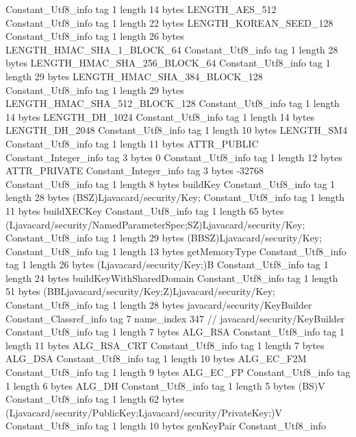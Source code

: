 {{		Constant_Utf8_info {
			tag	1
			length	14
			bytes	LENGTH_AES_512
		}
		Constant_Utf8_info {
			tag	1
			length	22
			bytes	LENGTH_KOREAN_SEED_128
		}
		Constant_Utf8_info {
			tag	1
			length	26
			bytes	LENGTH_HMAC_SHA_1_BLOCK_64
		}
		Constant_Utf8_info {
			tag	1
			length	28
			bytes	LENGTH_HMAC_SHA_256_BLOCK_64
		}
		Constant_Utf8_info {
			tag	1
			length	29
			bytes	LENGTH_HMAC_SHA_384_BLOCK_128
		}
		Constant_Utf8_info {
			tag	1
			length	29
			bytes	LENGTH_HMAC_SHA_512_BLOCK_128
		}
		Constant_Utf8_info {
			tag	1
			length	14
			bytes	LENGTH_DH_1024
		}
		Constant_Utf8_info {
			tag	1
			length	14
			bytes	LENGTH_DH_2048
		}
		Constant_Utf8_info {
			tag	1
			length	10
			bytes	LENGTH_SM4
		}
		Constant_Utf8_info {
			tag	1
			length	11
			bytes	ATTR_PUBLIC
		}
		Constant_Integer_info {
			tag	3
			bytes	0
		}
		Constant_Utf8_info {
			tag	1
			length	12
			bytes	ATTR_PRIVATE
		}
		Constant_Integer_info {
			tag	3
			bytes	-32768
		}
		Constant_Utf8_info {
			tag	1
			length	8
			bytes	buildKey
		}
		Constant_Utf8_info {
			tag	1
			length	28
			bytes	(BSZ)Ljavacard/security/Key;
		}
		Constant_Utf8_info {
			tag	1
			length	11
			bytes	buildXECKey
		}
		Constant_Utf8_info {
			tag	1
			length	65
			bytes	(Ljavacard/security/NamedParameterSpec;SZ)Ljavacard/security/Key;
		}
		Constant_Utf8_info {
			tag	1
			length	29
			bytes	(BBSZ)Ljavacard/security/Key;
		}
		Constant_Utf8_info {
			tag	1
			length	13
			bytes	getMemoryType
		}
		Constant_Utf8_info {
			tag	1
			length	26
			bytes	(Ljavacard/security/Key;)B
		}
		Constant_Utf8_info {
			tag	1
			length	24
			bytes	buildKeyWithSharedDomain
		}
		Constant_Utf8_info {
			tag	1
			length	51
			bytes	(BBLjavacard/security/Key;Z)Ljavacard/security/Key;
		}
		Constant_Utf8_info {
			tag	1
			length	28
			bytes	javacard/security/KeyBuilder
		}
		Constant_Classref_info {
			tag	7
			name_index	347		// javacard/security/KeyBuilder
		}
		Constant_Utf8_info {
			tag	1
			length	7
			bytes	ALG_RSA
		}
		Constant_Utf8_info {
			tag	1
			length	11
			bytes	ALG_RSA_CRT
		}
		Constant_Utf8_info {
			tag	1
			length	7
			bytes	ALG_DSA
		}
		Constant_Utf8_info {
			tag	1
			length	10
			bytes	ALG_EC_F2M
		}
		Constant_Utf8_info {
			tag	1
			length	9
			bytes	ALG_EC_FP
		}
		Constant_Utf8_info {
			tag	1
			length	6
			bytes	ALG_DH
		}
		Constant_Utf8_info {
			tag	1
			length	5
			bytes	(BS)V
		}
		Constant_Utf8_info {
			tag	1
			length	62
			bytes	(Ljavacard/security/PublicKey;Ljavacard/security/PrivateKey;)V
		}
		Constant_Utf8_info {
			tag	1
			length	10
			bytes	genKeyPair
		}
		Constant_Utf8_info {
}}}
